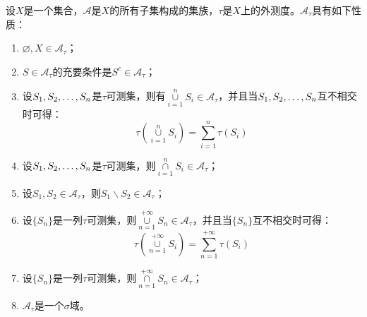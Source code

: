 \begin{property}\label{prop:tauMeasurableSetCollection}
	设$X$是一个集合，$\mathscr{A}$是$X$的所有子集构成的集族，$\tau$是$X$上的外测度。$\mathscr{A}_{\tau}$具有如下性质：
	\begin{enumerate}
		\item $\varnothing,X\in \mathscr{A}_{\tau}$； 
		\item $S\in \mathscr{A}_{\tau}$的充要条件是$S^c\in \mathscr{A}_{\tau}$；
		\item 设$S_1, S_2, \dots, S_{n}$是$\tau$可测集，则有$\underset{i=1}{\overset{n}{\cup}}S_i\in \mathscr{A}_{\tau}$，并且当$S_1, S_2, \dots, S_{n}$互不相交时可得：
		\begin{equation*}
			\tau\left(\underset{i=1}{\overset{n}{\cup}}S_i\right)=\sum_{i=1}^{n}\tau(S_i)
		\end{equation*}
		\item 设$S_1, S_2, \dots, S_{n}$是$\tau$可测集，则$\underset{i=1}{\overset{n}{\cap}}S_i\in \mathscr{A}_{\tau}$；
		\item 设$S_1,S_2\in \mathscr{A}_{\tau}$，则$S_1\backslash S_2\in \mathscr{A}_{\tau}$；
		\item 设$\{S_n\}$是一列$\tau$可测集，则$\underset{n=1}{\overset{+\infty}{\cup}}S_n\in \mathscr{A}_{\tau}$，并且当$\{S_n\}$互不相交时可得：
		\begin{equation*}
			\tau\left(\underset{n=1}{\overset{+\infty}{\cup}}S_i\right)=\sum_{n=1}^{+\infty}\tau(S_i)
		\end{equation*}
		\item 设$\{S_n\}$是一列$\tau$可测集，则$\underset{n=1}{\overset{+\infty}{\cap}}S_n\in\mathscr{A}_{\tau}$；
		\item $\mathscr{A}_\tau$是一个$\sigma$域。
	\end{enumerate}
\end{property}
